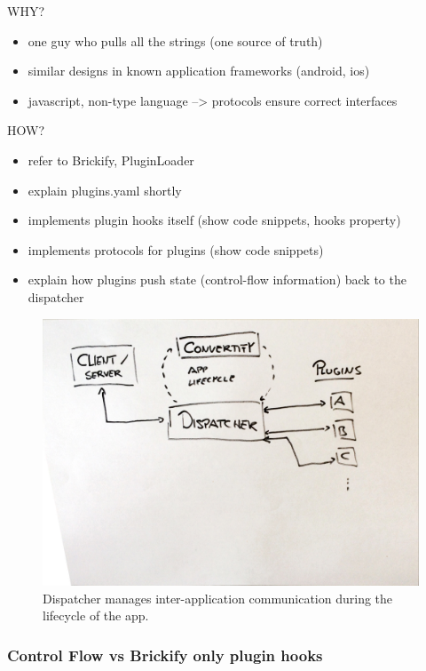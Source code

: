 \documentclass[../ClassicThesis.tex]{subfiles}
\begin{document}
WHY?

\begin{itemize}
\item one guy who pulls all the strings (one source of truth)
\item similar designs in known application frameworks (android, ios)
\item javascript, non-type language --> protocols ensure correct interfaces
\end{itemize}

HOW?

\begin{itemize}
\item refer to Brickify, PluginLoader
\item explain plugins.yaml shortly
\item implements plugin hooks itself (show code snippets, hooks property)

\item implements protocols for plugins (show code snippets)
\item explain how plugins push state (control-flow information) back to the
  dispatcher
\end{itemize}

\begin{figure}
  \centering
  \includegraphics[width=1\columnwidth]{Images/03-architecture_overview_dispatcher.jpg}
  \caption{Dispatcher manages inter-application communication during the lifecycle of the app.}
  \label{fig:architecture_overview_dispatcher}
\end{figure}


\subsubsection{Control Flow vs Brickify only plugin hooks}
\end{document}
